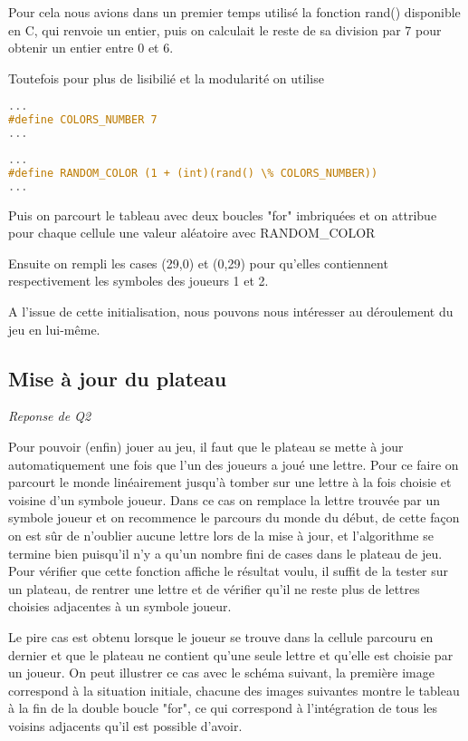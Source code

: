 \documentclass[a4paper,11pt]{article}
\begin{document}
Pour cela nous avions dans un premier temps  utilisé la fonction rand() disponible en C, qui renvoie un entier, puis on calculait le reste de sa division par 7 pour obtenir un entier entre 0 et 6. 

Toutefois pour plus de lisibilié et la modularité on utilise 
\begin{lstlisting}[language=C, caption=parameters.h]
...
#define COLORS_NUMBER 7
...
\end{lstlisting}

\begin{lstlisting}[language=C, caption=board.h]
...
#define RANDOM_COLOR (1 + (int)(rand() \% COLORS_NUMBER))
...
\end{lstlisting}

Puis on parcourt le tableau avec deux boucles "for" imbriquées et on attribue pour chaque cellule une valeur aléatoire avec RANDOM\_COLOR

Ensuite on rempli les cases (29,0) et (0,29) pour qu'elles contiennent respectivement les symboles des joueurs 1 et 2.

A l'issue de cette initialisation, nous pouvons nous intéresser au déroulement du jeu en lui-même.

\subsection{Mise à jour du plateau}
\emph{Reponse de Q2}

Pour pouvoir (enfin) jouer au jeu, il faut que le plateau se mette à jour automatiquement une fois que l'un des joueurs a joué une lettre. Pour ce faire on parcourt le monde linéairement jusqu'à tomber sur une lettre à la fois choisie et voisine d'un symbole joueur. Dans ce cas on remplace la lettre trouvée par un symbole joueur et on recommence le parcours du monde du début, de cette façon on est sûr de n'oublier aucune lettre lors de la mise à jour, et l'algorithme se termine bien puisqu'il n'y a qu'un nombre fini de cases dans le plateau de jeu. Pour vérifier que cette fonction affiche le résultat voulu, il suffit de la tester sur un plateau, de rentrer une lettre et de vérifier qu'il ne reste plus de lettres choisies adjacentes à un symbole joueur. 

Le pire cas est obtenu lorsque le joueur se trouve dans la cellule parcouru en dernier et que le plateau ne contient qu'une seule lettre et qu'elle est choisie par un joueur. On peut illustrer ce cas avec le schéma suivant, la première image correspond à la situation initiale, chacune des images suivantes montre le tableau à la fin de la double boucle "for", ce qui correspond à l'intégration de tous les voisins adjacents qu'il est possible d'avoir.
\end{document}
